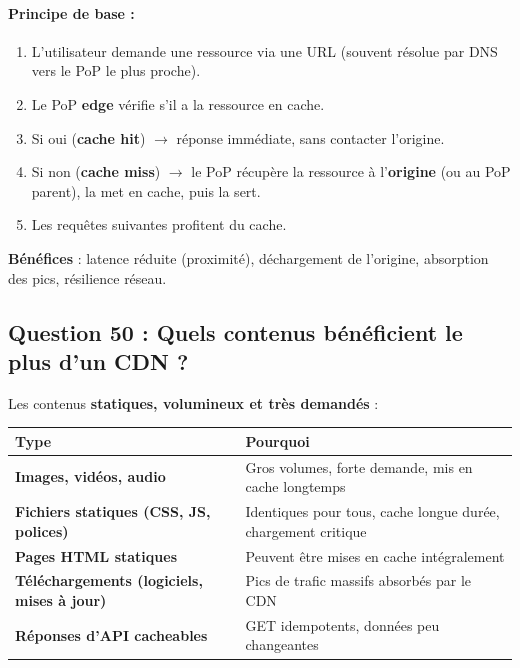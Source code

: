 \documentclass[12pt,a4paper]{article}
\begin{document}
\paragraph{Principe de base :}
\begin{enumerate}
  \item L'utilisateur demande une ressource via une URL (souvent r\'esolue par DNS vers le PoP le plus proche).
  \item Le PoP \textbf{edge} v\'erifie s'il a la ressource en cache.
  \item Si oui (\textbf{cache hit}) $\rightarrow$ r\'eponse imm\'ediate, sans contacter l'origine.
  \item Si non (\textbf{cache miss}) $\rightarrow$ le PoP r\'ecup\`ere la ressource \`a l'\textbf{origine} (ou au PoP parent), la met en cache, puis la sert.
  \item Les requ\^etes suivantes profitent du cache.
\end{enumerate}

\textbf{B\'en\'efices} : latence r\'eduite (proximit\'e), d\'echargement de l'origine, absorption des pics, r\'esilience r\'eseau.

\subsection*{Question 50 : Quels contenus b\'en\'eficient le plus d'un CDN ?}

Les contenus \textbf{statiques, volumineux et tr\`es demand\'es} :

\medskip
\noindent
\begin{tabularx}{\textwidth}{@{}>{\raggedright\arraybackslash}p{5.2cm} Y@{}}
\toprule
\textbf{Type} & \textbf{Pourquoi} \\
\midrule
\textbf{Images, vid\'eos, audio} & Gros volumes, forte demande, mis en cache longtemps \\
\textbf{Fichiers statiques (CSS, JS, polices)} & Identiques pour tous, cache longue dur\'ee, chargement critique \\
\textbf{Pages HTML statiques} & Peuvent \^etre mises en cache int\'egralement \\
\textbf{T\'el\'echargements (logiciels, mises \`a jour)} & Pics de trafic massifs absorb\'es par le CDN \\
\textbf{R\'eponses d'API cacheables} & GET idempotents, donn\'ees peu changeantes \\
\bottomrule
\end{tabularx}
\end{document}

